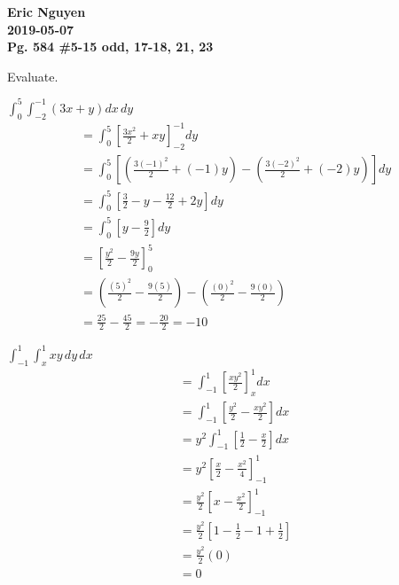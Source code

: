 \documentclass[12pt]{article}
\newenvironment{problem}[2][]{
    \begin{trivlist}
        \item[
            {\bfseries #1}
            {\bfseries #2.}
        ]
}{\end{trivlist}}
\newcommand{\assignment}{Pg. 584 \#5-15 odd, 17-18, 21, 23}
\newcommand{\name}{Eric Nguyen}
\newcommand{\duedate}{2019-05-07}
\newcommand{\details}{\noindent\textbf{\name \\\duedate \\\assignment}}
\begin{document}
\details

\bigskip

\noindent Evaluate.

\begin{problem}{5}
    $\displaystyle\int_0^5 \displaystyle\int_{-2}^{-1} \left(3x + y\right) dx \, dy$
    \begin{align}
        &= \int_0^5 \left[\frac{3x^2}{2} + xy\right]_{-2}^{-1} dy \\
        &= \int_0^5 \left[\left(\frac{3\left(-1\right)^2}{2} + \left(-1\right)y\right) - \left(\frac{3\left(-2\right)^2}{2} + \left(-2\right)y\right)\right] dy \\
        &= \int_0^5 \left[\frac{3}{2} - y - \frac{12}{2} + 2y\right] dy \\
        &= \int_0^5 \left[y - \frac{9}{2}\right] dy \\
        &= \left[\frac{y^2}{2} - \frac{9y}{2}\right]_0^5 \\
        &= \left(\frac{\left(5\right)^2}{2} - \frac{9\left(5\right)}{2}\right) - \left(\frac{\left(0\right)^2}{2} - \frac{9\left(0\right)}{2}\right) \\
        &= \frac{25}{2} - \frac{45}{2} = -\frac{20}{2} = -10
    \end{align}
\end{problem}

\begin{problem}{7}
    $\displaystyle\int_{-1}^1 \displaystyle\int_x^1 xy \, dy \, dx$
    \begin{align}
        &= \int_{-1}^1 \left[\frac{xy^2}{2}\right]_x^1 dx \\
        &= \int_{-1}^1 \left[\frac{y^2}{2} - \frac{xy^2}{2}\right] dx \\
        &= y^2 \int_{-1}^1 \left[\frac{1}{2} - \frac{x}{2}\right] dx \\
        &= y^2 \left[\frac{x}{2} - \frac{x^2}{4}\right]_{-1}^1 \\
        &= \frac{y^2}{2} \left[x - \frac{x^2}{2}\right]_{-1}^1 \\
        &= \frac{y^2}{2} \left[1 - \frac{1}{2} - 1 + \frac{1}{2}\right] \\
        &= \frac{y^2}{2} \left(0\right) \\
        &= 0
    \end{align}
\end{problem}
\end{document}
